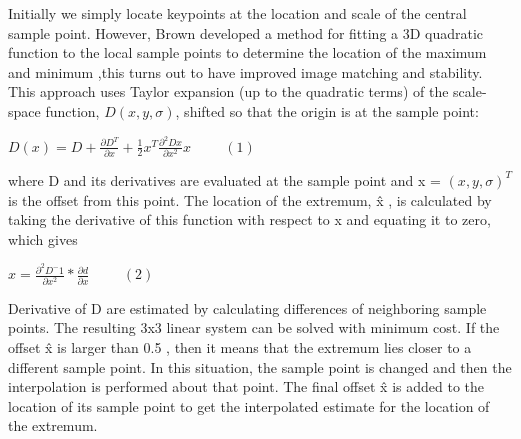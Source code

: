 \documentclass[12pt,a4paper]{report}
\begin{document}
\begin{flushleft}
\vspace{10mm}



Initially we simply locate keypoints at the location and scale of the central sample point. However, Brown developed  a method for fitting a 3D quadratic function to the local sample points to determine the location of the maximum and minimum ,this turns out to have improved image matching and stability. This approach uses  Taylor expansion (up to the quadratic terms) of the scale-space function, $D(x, y, \sigma)$, shifted so that the origin is at the sample point:\par

\vspace{10mm}

\begin{center}$D(x) = D+ \frac{\partial D^T}{\partial x} +\frac{1}{2} x^T \frac{\partial^2 Dx}{\partial x^2}x\hspace{1cm}(1)$ \end{center}

\vspace{10mm}


where D and its derivatives are evaluated at the sample point and x = $(x, y,\sigma)^T$ is the offset from this point. The location of the extremum, \^x , is calculated by taking the derivative of this function with respect to x and equating  it to zero, which gives\par

\vspace{10mm}

\begin{center}$ \hat x = \frac{\partial^2 D^-1}{\partial x^2}*\frac{\partial d}{\partial x}\hspace{1cm}(2)             $\end{center} 
\vspace{10mm}


Derivative of D are estimated by calculating differences of neighboring sample points. The resulting 3x3 linear system can be solved with minimum cost. If the offset \^x is larger than 0.5 , then it means that the extremum lies closer to a different sample point. In this situation, the sample point is changed and then the interpolation is performed  about that point. The final offset \^x  is added to the location of its sample point to get the interpolated estimate for the location of the extremum. \par
\vspace{10mm}







\end{flushleft}
\end{document}
